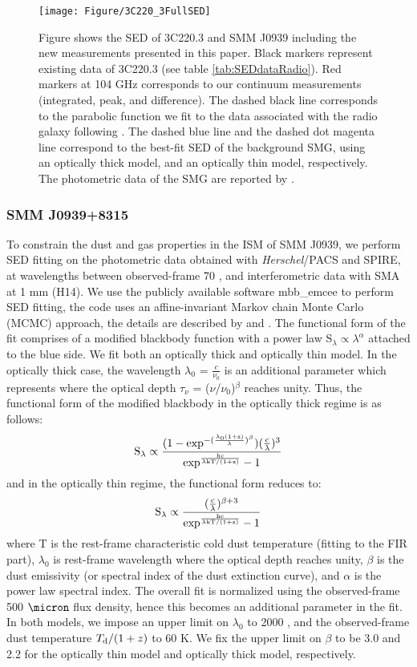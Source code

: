 \documentclass{emulateapj}
\begin{document}
\begin{figure}[!tbph]
\centering
\texttt{[image: Figure/3C220\_3FullSED]}
\caption{Figure shows the SED of 3C220.3 and SMM J0939 including the new measurements presented in this paper. 
Black markers represent existing data of 3C220.3 (see table \ref{tab:SEDdataRadio}). Red markers at 104 GHz corresponds to 
our continuum measurements (integrated, peak, and difference). The dashed black line corresponds to the parabolic function we 
fit to the data associated with the radio galaxy following \citet{Cleary07a}. The dashed blue line and 
the dashed dot magenta line correspond to the best-fit SED of the background SMG, using an optically thick model, and an 
optically thin model, respectively. The photometric data of the SMG are reported by \citet{Haas14}. \label{fig:SED}}
\end{figure}

\subsubsection{SMM J0939+8315} 
To constrain the dust and gas properties in the ISM of SMM J0939, we perform SED fitting on the
photometric data obtained with {\it Herschel}/PACS and SPIRE, at wavelengths
between observed-frame 70  \micron, and interferometric data with SMA at 1 mm (H14). We use the publicly
available software {\sc mbb\_emcee} to perform SED fitting, the code uses an affine-invariant Markov chain Monte
Carlo (MCMC) approach, the details are described by \citet{Riechers13a} and \citet{Dowell14a}. The
functional form of the fit comprises of a modified blackbody function with a power law S$_{\lambda} \propto \lambda^\alpha
$ attached to the blue
side.
We fit both an optically thick and optically thin model. In the optically thick case, the wavelength $
\lambda_0$ = $\frac{c}{\nu_0}$ is an additional parameter which represents where the optical
depth $\tau_{\nu}$ = ($\nu$/$\nu_0$)$^\beta$ reaches unity. Thus, the functional form of the modified blackbody
in the optically thick regime is as follows:
\begin{equation}
\rm S_{\lambda} \propto \frac{(1-exp^{-(\frac{\lambda_0 (1+z)}{\lambda})^{\beta}})(\frac{c}{\lambda})^3}
{exp^{\frac{hc}{\lambda\rm{kT/(1+z)} } }-1}
\end{equation}
and in the optically thin regime, the functional form reduces to:
\begin{equation}
\rm S_{\lambda} \propto \frac{(\frac{c}{\lambda})^{\beta+3}}{exp^{\frac{hc}{\lambda\rm{kT/(1+z)}}}-1}
\end{equation}
where T is the rest-frame characteristic cold dust temperature (fitting to the FIR part), $\lambda_0$ is rest-frame wavelength
where the optical depth reaches unity, $\beta$ is the dust emissivity (or spectral index of the dust extinction
curve), and $\alpha$ is the power law spectral index. The overall fit is normalized using the observed-frame 500
$\micron$ flux density, hence this becomes an additional parameter in the fit. In both models, we impose an upper limit on $
\lambda_0$ to 2000 \micron, and the observed-frame dust temperature $T_{\rm d}/(1+z)$ to 60 K. We fix the upper limit on 
$\beta$ to be 3.0 and 2.2 for the optically thin model and optically thick model, respectively.
\end{document}
